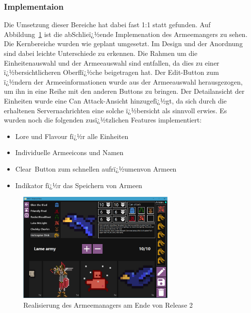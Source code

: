 \documentclass[12pt, titlepage]{scrartcl}
\newcommand{\Abb}[1]{%
	Abbildung\ \ref{#1}%
}
\begin{document}
			\subsubsection{Implementaion} Die Umsetzung dieser Bereiche hat dabei fast 1:1 statt gefunden. Auf \Abb{ImplementierungArmeemanager} ist die abSchlieï¿½ende Implemenation des Armeemangers zu sehen. Die Kernbereiche wurden wie geplant umgesetzt. Im Design und der Anordnung sind dabei leichte Unterschiede zu erkennen. Die Rahmen um die Einheitenauswahl und der Armeeauswahl sind entfallen, da dies zu einer ï¿½bersichtlicheren Oberflï¿½che beigetragen hat. Der Edit-Button zum ï¿½ndern der Armeeinformationen wurde aus der Armeeauswahl herausgezogen, um ihn in eine Reihe mit den anderen Buttons zu bringen. Der Detailansicht der Einheiten wurde eine Can Attack-Ansicht hinzugefï¿½gt, da sich durch die erhaltenen Servernachrichten eine solche ï¿½bersicht als sinnvoll erwies.
			Es wurden noch die folgenden zusï¿½tzlichen Features implementiert:
			\begin{itemize}
				\item Lore und Flavour fï¿½r alle Einheiten
				\item Individuelle Armeeicons und Namen
				\item Clear\ Button zum schnellen \glqq aufrï¿½umen\grqq von Armeen
				\item Indikator fï¿½r das Speichern von Armeen
			\end{itemize}
			
			\begin{figure}[H] 
				\centering
				\includegraphics[width=0.7\textwidth]{ArmyBuilder_final.PNG}
				\caption{Realisierung des Armeemanagers am Ende von Release 2}
				\label{ImplementierungArmeemanager}
			\end{figure}
		
\end{document}

